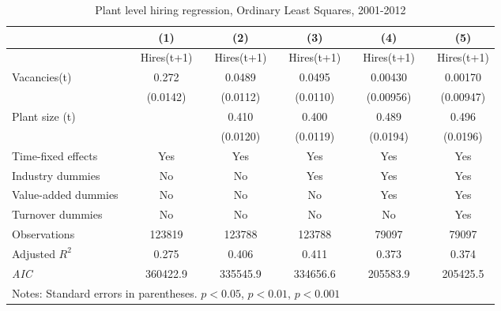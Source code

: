 \begin{table}[htbp]
\caption{\label{tab:main_ols} Plant level hiring regression, Ordinary Least Squares,  2001-2012}
\begin{tabularx} {\textwidth} { l X cXcXcXcXc}
\hline
       &&   (1) &&     (2) &&    (3)       &&   (4)        &&   (5)      \\
\hline
        &&   \footnotesize{ Hires(t+1)} &&     \footnotesize{ Hires(t+1)} &&    \footnotesize{ Hires(t+1)}      &&  \footnotesize{ Hires(t+1)}       &&    \footnotesize{ Hires(t+1)}     \\
\hline
\scriptsize{Vacancies(t) }       &&    0.272\sym{***} &&   0.0489\sym{***} &&   0.0495\sym{***} &&  0.00430         &&  0.00170          \\
                    &&    (0.0142)         && (0.0112)         && (0.0110)         && (0.00956)         &&(0.00947)          \\
\scriptsize{Plant size (t) }     &&                   &&    0.410\sym{***} &&   0.400\sym{***} &&    0.489\sym{***} &&    0.496\sym{***}\\
                    &&                   && (0.0120)         && (0.0119)         && (0.0194)         && (0.0196)            \\
\hline
\scriptsize{Time-fixed effects } && Yes                 && Yes                     &&           Yes          &&    Yes        &&    Yes      \\
\scriptsize{Industry dummies}    && No                  && No                      &&     Yes                 &&    Yes        &&   Yes      \\
\scriptsize{Value-added dummies} && No                  && No                      &&     No                 &&    Yes        &&    Yes      \\
\scriptsize{Turnover dummies }   && No                  && No                      &&     No                 &&    No        &&    Yes      \\
\hline
\scriptsize{Observations}        &&    123819         &&   123788         &&   123788         &&    79097         &&   79097        \\
\scriptsize{Adjusted} \(R^{2}\)  &&     0.275         &&    0.406         &&    0.411         &&    0.373         &&    0.374        \\
\textit{AIC}        &&  360422.9         && 335545.9         && 334656.6         && 205583.9         && 205425.5           \\
\hline\hline
\multicolumn{11}{l}{\footnotesize Notes: Standard errors in parentheses. \sym{*} \(p<0.05\), \sym{**} \(p<0.01\), \sym{***} \(p<0.001\) }\\
\end{tabularx}
\end{table}

